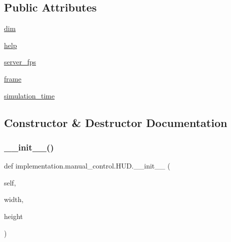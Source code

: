 \subsection*{Public Attributes}
\begin{DoxyCompactItemize}
\item 
\hyperlink{classimplementation_1_1manual__control_1_1_h_u_d_a4eec82f55878222edf93d0742dcd133e}{dim}
\item 
\hyperlink{classimplementation_1_1manual__control_1_1_h_u_d_aea7f44c49123f8f4d38ba12fe15332dc}{help}
\item 
\hyperlink{classimplementation_1_1manual__control_1_1_h_u_d_a418909515eb46abea3fcb26f42020c68}{server\+\_\+fps}
\item 
\hyperlink{classimplementation_1_1manual__control_1_1_h_u_d_a83d58bd2583209bd349cfcd22e40784c}{frame}
\item 
\hyperlink{classimplementation_1_1manual__control_1_1_h_u_d_a9030c299b81352e1cea2e1f3eb8498d8}{simulation\+\_\+time}
\end{DoxyCompactItemize}


\subsection{Constructor \& Destructor Documentation}
\mbox{\label{classimplementation_1_1manual__control_1_1_h_u_d_a0cfbc7b3d4bd4442e0ded8bb75d5cc93}} 
\subsubsection{\texorpdfstring{\+\_\+\+\_\+init\+\_\+\+\_\+()}{\_\_init\_\_()}}
{\footnotesize\ttfamily def implementation.\+manual\+\_\+control.\+H\+U\+D.\+\_\+\+\_\+init\+\_\+\+\_\+ (\begin{DoxyParamCaption}\item[{}]{self,  }\item[{}]{width,  }\item[{}]{height }\end{DoxyParamCaption})}



